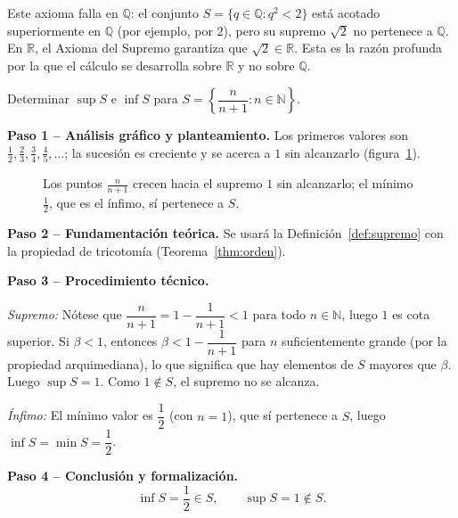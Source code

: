 \begin{rem}
Este axioma falla en $\mathbb{Q}$: el conjunto
$S = \{q \in \mathbb{Q} : q^2 < 2\}$ está acotado superiormente en
$\mathbb{Q}$ (por ejemplo, por $2$), pero su supremo $\sqrt{2}$ no
pertenece a $\mathbb{Q}$. En $\mathbb{R}$, el Axioma del Supremo garantiza que
$\sqrt{2} \in \mathbb{R}$. Esta es la razón profunda por la que el cálculo se
desarrolla sobre $\mathbb{R}$ y no sobre $\mathbb{Q}$.
\end{rem}

\begin{example} Determinar $\sup S$ e $\inf S$ para $S = \left\{\dfrac{n}{n+1} : n \in
\mathbb{N}\right\}$.

\begin{myproof}
\textbf{Paso 1 – Análisis gráfico y planteamiento.}
Los primeros valores son $\tfrac{1}{2}, \tfrac{2}{3}, \tfrac{3}{4},
\tfrac{4}{5},\ldots$; la sucesión es creciente y se acerca a $1$ sin
alcanzarlo (figura~\ref{fig:supremo_sucesion}).

\begin{figure}[H]
\centering
{}
\caption{Los puntos $\tfrac{n}{n+1}$ crecen hacia el supremo $1$ sin
alcanzarlo; el mínimo $\tfrac{1}{2}$, que es el ínfimo, sí pertenece
a $S$.}
\label{fig:supremo_sucesion}
\end{figure}

\textbf{Paso 2 – Fundamentación teórica.}
Se usará la Definición~\ref{def:supremo} con la propiedad de tricotomía
(Teorema~\ref{thm:orden}).

\textbf{Paso 3 – Procedimiento técnico.}

\emph{Supremo:} Nótese que $\dfrac{n}{n+1} = 1 - \dfrac{1}{n+1} < 1$ para
todo $n \in \mathbb{N}$, luego $1$ es cota superior. Si $\beta < 1$,
entonces $\beta < 1 - \dfrac{1}{n+1}$ para $n$ suficientemente grande
(por la propiedad arquimediana), lo que significa que hay elementos de $S$
mayores que $\beta$. Luego $\sup S = 1$. Como $1 \notin S$, el supremo no
se alcanza.

\emph{Ínfimo:} El mínimo valor es $\dfrac{1}{2}$ (con $n=1$), que sí
pertenece a $S$, luego $\inf S = \min S = \dfrac{1}{2}$.

\textbf{Paso 4 – Conclusión y formalización.}
\[
   \boxed{\inf S = \frac{1}{2} \in S, \qquad \sup S = 1 \notin S.}
\]
\end{myproof}
\end{example}

